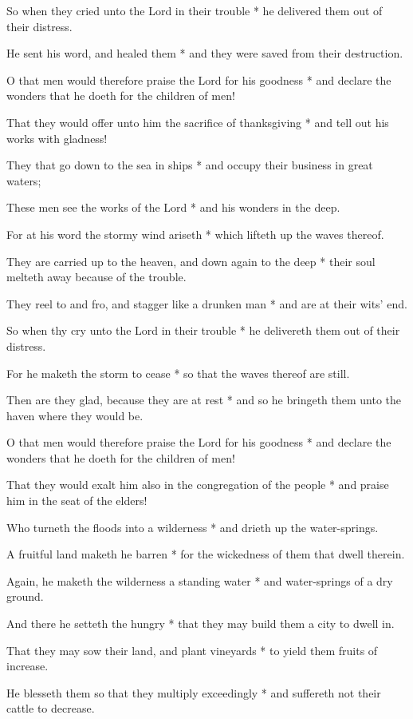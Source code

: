 So when they cried unto the Lord in their trouble * he delivered them out of their distress.

He sent his word, and healed them * and they were saved from their destruction.

O that men would therefore praise the Lord for his goodness * and declare the wonders that he doeth for the children of men!

That they would offer unto him the sacrifice of thanksgiving * and tell out his works with gladness!

They that go down to the sea in ships * and occupy their business in great waters;

These men see the works of the Lord * and his wonders in the deep.

For at his word the stormy wind ariseth * which lifteth up the waves thereof.

They are carried up to the heaven, and down again to the deep * their soul melteth away because of the trouble.

They reel to and fro, and stagger like a drunken man * and are at their wits' end.

So when thy cry unto the Lord in their trouble * he delivereth them out of their distress.

For he maketh the storm to cease * so that the waves thereof are still.

Then are they glad, because they are at rest * and so he bringeth them unto the haven where they would be.

O that men would therefore praise the Lord for his goodness * and declare the wonders that he doeth for the children of men!

That they would exalt him also in the congregation of the people * and praise him in the seat of the elders!

Who turneth the floods into a wilderness * and drieth up the water-springs.

A fruitful land maketh he barren * for the wickedness of them that dwell therein.

Again, he maketh the wilderness a standing water * and water-springs of a dry ground.

And there he setteth the hungry * that they may build them a city to dwell in.

That they may sow their land, and plant vineyards * to yield them fruits of increase.

He blesseth them so that they multiply exceedingly * and suffereth not their cattle to decrease.


